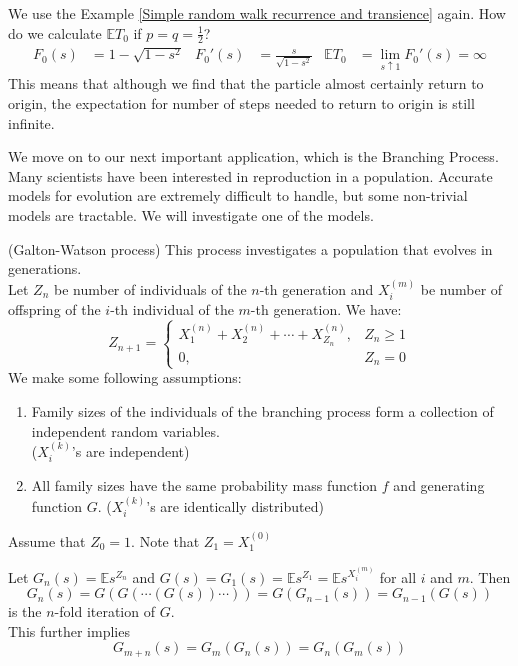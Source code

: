 \documentclass{huhtakm-template-book}
\newcommand{\expect}{\mathbb{E}}
\begin{document}
\begin{eg}
    We use the Example \ref{Simple random walk recurrence and transience} again. How do we calculate $\expect T_{0}$ if $p=q=\frac{1}{2}$?
    \begin{align*}
        F_{0}(s)&=1-\sqrt{1-s^{2}} & F_{0}'(s)&=\frac{s}{\sqrt{1-s^{2}}} & \expect T_{0}&=\lim_{s\uparrow 1}F_{0}'(s)=\infty
    \end{align*}
    This means that although we find that the particle almost certainly return to origin, the expectation for number of steps needed to return to origin is still infinite.
\end{eg}
We move on to our next important application, which is the Branching Process.\\
Many scientists have been interested in reproduction in a population. Accurate models for evolution are extremely difficult to handle, but some non-trivial models are tractable. We will investigate one of the models.
\begin{eg}(Galton-Watson process) 
    This process investigates a population that evolves in generations.\\
    Let $Z_{n}$ be number of individuals of the $n$-th generation and $X_{i}^{(m)}$ be number of offspring of the $i$-th individual of the $m$-th generation. We have:
    \begin{equation*}
        Z_{n+1}=\begin{cases}
            X_{1}^{(n)}+X_{2}^{(n)}+\cdots+X_{Z_{n}}^{(n)}, &Z_{n}\geq 1\\
            0, &Z_{n}=0
        \end{cases}
    \end{equation*}
    We make some following assumptions:
    \begin{enumerate}
        \item Family sizes of the individuals of the branching process form a collection of independent random variables.\\
        ($X_{i}^{(k)}$'s are independent)
        \item All family sizes have the same probability mass function $f$ and generating function $G$. ($X_{i}^{(k)}$'s are identically distributed)
    \end{enumerate}
    Assume that $Z_{0}=1$. Note that $Z_{1}=X_{1}^{(0)}$
\end{eg}
\begin{thm}
    \label{Chapter 5 Theorem Galton-Watson process PGF n-fold iterate properties}
    Let $G_{n}(s)=\expect s^{Z_{n}}$ and $G(s)=G_{1}(s)=\expect s^{Z_{1}}=\expect s^{X_{i}^{(m)}}$ for all $i$ and $m$. Then
    \begin{equation*}
        G_{n}(s)=G(G(\cdots(G(s))\cdots))=G(G_{n-1}(s))=G_{n-1}(G(s))
    \end{equation*}
    is the $n$-fold iteration of $G$.\\
    This further implies
    \begin{equation*}
        G_{m+n}(s)=G_{m}(G_{n}(s))=G_{n}(G_{m}(s))
    \end{equation*}
\end{thm}
\end{document}
